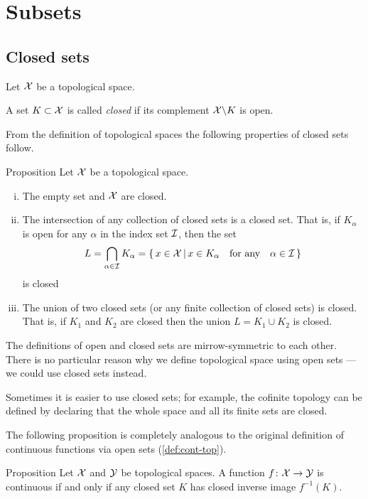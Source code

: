 \chapter{Subsets}

\section{Closed sets}

Let $\mathcal{X}$ be a topological space. 

A set $K\subset \mathcal{X}$ is called \emph{closed} if its complement $\mathcal{X}\backslash K$ is open.

From the definition of topological spaces the following properties of closed sets follow.

\begin{thm}{Proposition}\label{prop:closed-properties}
Let $\mathcal{X}$ be a topological space. 
\begin{enumerate}[(i)] 
\item The empty set and $\mathcal{X}$ are closed.
\item The intersection of any collection of closed sets is a closed set.
That is, if $K_\alpha$ is open for any $\alpha$ in the index set $\mathcal{I}$,
then the set
\[L=\bigcap_{\alpha\in \mathcal{I}} K_\alpha
=
\left\{\,{x\in \mathcal{X}}\,\middle|\,{x\in K_\alpha\quad\text{for any}\quad\alpha\in \mathcal{I}}\,\right\}\]
is closed
\item\label{def:top-space:n} 
The union of two closed sets (or any finite collection of closed sets) is closed.  
That is,  if $K_1$ and $K_2$ are closed then the union $L=K_1 \cup K_2$ is closed. 
\end{enumerate}
\end{thm}

The definitions of open and closed sets are mirrow-symmetric to each other.
There is no particular reason why we define topological space using open sets --- we could use closed sets instead.

Sometimes it is easier to use closed sets; 
for example, the cofinite topology can be defined by declaring that the whole space and all its finite sets are closed.

The following proposition is completely analogous to the original definition of continuous functions via open sets (\ref{def:cont-top}). 

\begin{thm}{Proposition}\label{prop:cont-closed}
Let $\mathcal{X}$ and $\mathcal{Y}$ be topological spaces.
A function $f\colon\mathcal{X}\to\mathcal{Y}$ is continuous if and only if any closed set $K$ has closed inverse image $f^{-1}(K)$.
\end{thm}


